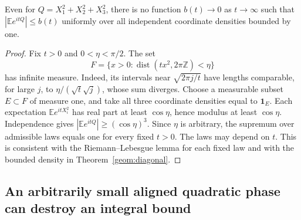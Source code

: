 \begin{proposition}\label{lim:pointwise}
Even for $Q=X_1^2+X_2^2+X_3^2$, there is no function $b(t)\to0$ as $t\to\infty$ such that $|\mathbb E e^{itQ}|\le b(t)$ uniformly over all independent coordinate densities bounded by one.
\end{proposition}
\begin{proof}
Fix $t>0$ and $0<\eta<\pi/2$. The set
\[
 F=\{x>0:\operatorname{dist}(tx^2,2\pi\mathbb Z)<\eta\}
\]
has infinite measure. Indeed, its intervals near $\sqrt{2\pi j/t}$ have lengths comparable, for large $j$, to $\eta/(\sqrt t\sqrt j)$, whose sum diverges. Choose a measurable subset $E\subset F$ of measure one, and take all three coordinate densities equal to $\mathbf1_E$. Each expectation $\mathbb E e^{itX_i^2}$ has real part at least $\cos\eta$, hence modulus at least $\cos\eta$. Independence gives $|\mathbb E e^{itQ}|\ge(\cos\eta)^3$. Since $\eta$ is arbitrary, the supremum over admissible laws equals one for every fixed $t>0$. The laws may depend on $t$. This is consistent with the Riemann--Lebesgue lemma for each fixed law and with the bounded density in Theorem~\ref{geom:diagonal}.
\end{proof}

\subsection{An arbitrarily small aligned quadratic phase can destroy an integral bound}

